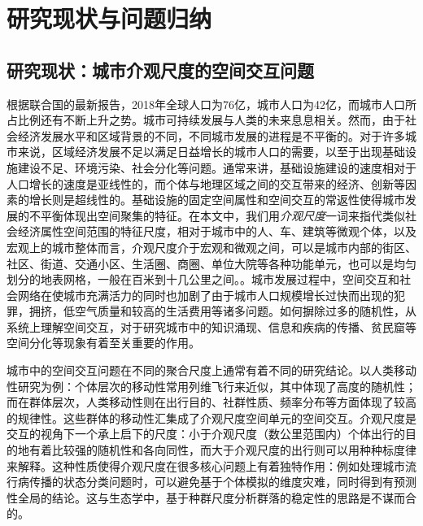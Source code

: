 \chapter{研究现状与问题归纳}

\section{研究现状：城市介观尺度的空间交互问题}

根据联合国的最新报告，2018年全球人口为76亿，城市人口为42亿，而城市人口所占比例还有不断上升之势\cite{unreport2018}。城市可持续发展与人类的未来息息相关。然而，由于社会经济发展水平和区域背景的不同，不同城市发展的进程是不平衡的\cite{seto2013book}。对于许多城市来说，区域经济发展不足以满足日益增长的城市人口的需要，以至于出现基础设施建设不足、环境污染、社会分化等问题\cite{zhao2021global}。通常来讲，基础设施建设的速度相对于人口增长的速度是亚线性的，而个体与地理区域之间的交互带来的经济、创新等因素的增长则是超线性的\cite{yakubo2014superlinear}。基础设施的固定空间属性和空间交互的常返性使得城市发展的不平衡体现出空间聚集的特征\cite{gonzalez2008understanding, wang2016process}。在本文中，我们用\textit{介观尺度}一词来指代类似社会经济属性空间范围的特征尺度，相对于城市中的人、车、建筑等微观个体，以及宏观上的城市整体而言，介观尺度介于宏观和微观之间，可以是城市内部的街区、社区、街道、交通小区、生活圈、商圈、单位大院等各种功能单元，也可以是均匀划分的地表网格，一般在百米到十几公里之间。\cite{raimbault2020empowering}。城市发展过程中，空间交互和社会网络在使城市充满活力的同时也加剧了由于城市人口规模增长过快而出现的犯罪，拥挤，低空气质量和较高的生活费用等诸多问题\cite{toth2021inequality}。如何摒除过多的随机性，从系统上理解空间交互，对于研究城市中的知识涌现、信息和疾病的传播、贫民窟等空间分化等现象有着至关重要的作用。

城市中的空间交互问题在不同的聚合尺度上通常有着不同的研究结论。以人类移动性研究为例：个体层次的移动性常用列维飞行来近似\cite{brockmann2006scaling,gonzalez2008understanding,mantegna1994stochastic,metzler2007some}，其中体现了高度的随机性；而在群体层次，人类移动性则在出行目的、社群性质、频率分布等方面体现了较高的规律性\cite{peng2012collective, jiang2017collective, dong2020spectral, wachowicz2016finding}。这些群体的移动性汇集成了介观尺度空间单元的空间交互。介观尺度是交互的视角下一个承上启下的尺度：小于介观尺度（数公里范围内）个体出行的目的地有着比较强的随机性和各向同性\cite{berry1958recent, degroot1974reaching, jurdak2015understanding}，而大于介观尺度的出行则可以用种种标度律来解释\cite{gonzalez2008understanding, brockmann2006scaling}。这种性质使得介观尺度在很多核心问题上有着独特作用：例如处理城市流行病传播的状态分类问题时，可以避免基于个体模拟的维度灾难，同时得到有预测性全局的结论\cite{colizza2007invasion, colizza2007reaction, watts2005multiscale}。这与生态学中，基于种群尺度分析群落的稳定性的思路是不谋而合的\cite{may1972will, allesina2012stability}。

